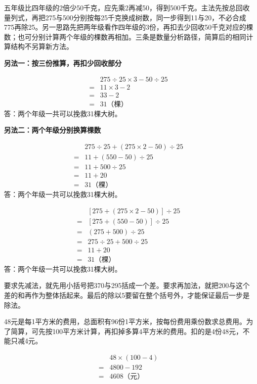 \documentclass[multi=snippet,border=0pt]{standalone}
\newenvironment{snippet}[3]{\begin{minipage}{#1bp}\color{answerred}\fontsize{#2}{#3}\selectfont\raggedright}{\end{minipage}}
\begin{document}
\begin{snippet}{505}{11.5}{14}五年级比四年级的2倍少50千克，应先乘2再减50，得到500千克。主法先按总回收量列式，再把275与500分别按每25千克换成树数，同一步得到11与20，不必合成775再除25。另一思路先把两年级看作四年级的3份，再扣去少回收50千克对应的棵数；也可分别计算两个年级的棵数再相加。三条是数量分析路径，简算后的相同计算结构不另算新方法。\par \textbf{另法一：按三份推算，再扣少回收部分}\par \[\begin{aligned}&275\div25\times3-50\div25\\={}&11\times3-2\\={}&33-2\\={}&31\text{（棵）}\end{aligned}\]答：两个年级一共可以挽救31棵大树。\par \textbf{另法二：两个年级分别换算棵数}\par \[\begin{aligned}&275\div25+(275\times2-50)\div25\\={}&11+(550-50)\div25\\={}&11+500\div25\\={}&11+20\\={}&31\text{（棵）}\end{aligned}\]答：两个年级一共可以挽救31棵大树。\end{snippet}
\begin{snippet}{356}{10.5}{12.8}\[\begin{aligned}&[275+(275\times2-50)]\div25\\={}&[275+(550-50)]\div25\\={}&(275+500)\div25\\={}&275\div25+500\div25\\={}&11+20\\={}&31\text{（棵）}\end{aligned}\]答：两个年级一共可以挽救31棵大树。\end{snippet}
\begin{snippet}{505}{11.5}{14}要求先减法，就先用小括号把370与295括成一个差。要求再加法，就把200与这个差的和再作为整体括起来。最后的除以5要留在整个括号外，才能保证最后一步是除法。\end{snippet}
\begin{snippet}{505}{11.5}{14}48元是每1平方米的费用，总面积有96份1平方米，按每份费用乘份数求总费用。为了简算，可先按100平方米计算，再扣掉多算4平方米的费用。扣的是4份48元，不能只减4元。\par \[\begin{aligned}&48\times(100-4)\\={}&4800-192\\={}&4608\text{（元）}\end{aligned}\]\end{snippet}
\end{document}

